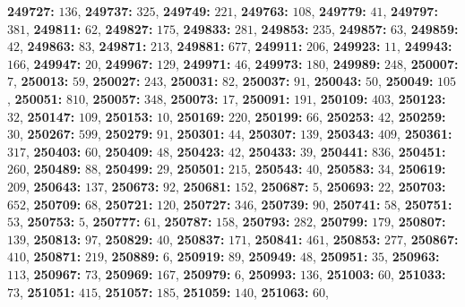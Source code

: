 \textsf{\bfseries 249727:} $136$, \textsf{\bfseries 249737:} $325$, \textsf{\bfseries 249749:} $221$, \textsf{\bfseries 249763:} $108$, \textsf{\bfseries 249779:} $41$, \textsf{\bfseries 249797:} $381$, \textsf{\bfseries 249811:} $62$, \textsf{\bfseries 249827:} $175$, \textsf{\bfseries 249833:} $281$, \textsf{\bfseries 249853:} $235$, \textsf{\bfseries 249857:} $63$, \textsf{\bfseries 249859:} $42$, \textsf{\bfseries 249863:} $83$, \textsf{\bfseries 249871:} $213$, \textsf{\bfseries 249881:} $677$, \textsf{\bfseries 249911:} $206$, \textsf{\bfseries 249923:} $11$, \textsf{\bfseries 249943:} $166$, \textsf{\bfseries 249947:} $20$, \textsf{\bfseries 249967:} $129$, \textsf{\bfseries 249971:} $46$, \textsf{\bfseries 249973:} $180$, \textsf{\bfseries 249989:} $248$, \textsf{\bfseries 250007:} $7$, \textsf{\bfseries 250013:} $59$, \textsf{\bfseries 250027:} $243$, \textsf{\bfseries 250031:} $82$, \textsf{\bfseries 250037:} $91$, \textsf{\bfseries 250043:} $50$, \textsf{\bfseries 250049:} $105$, \textsf{\bfseries 250051:} $810$, \textsf{\bfseries 250057:} $348$, \textsf{\bfseries 250073:} $17$, \textsf{\bfseries 250091:} $191$, \textsf{\bfseries 250109:} $403$, \textsf{\bfseries 250123:} $32$, \textsf{\bfseries 250147:} $109$, \textsf{\bfseries 250153:} $10$, \textsf{\bfseries 250169:} $220$, \textsf{\bfseries 250199:} $66$, \textsf{\bfseries 250253:} $42$, \textsf{\bfseries 250259:} $30$, \textsf{\bfseries 250267:} $599$, \textsf{\bfseries 250279:} $91$, \textsf{\bfseries 250301:} $44$, \textsf{\bfseries 250307:} $139$, \textsf{\bfseries 250343:} $409$, \textsf{\bfseries 250361:} $317$, \textsf{\bfseries 250403:} $60$, \textsf{\bfseries 250409:} $48$, \textsf{\bfseries 250423:} $42$, \textsf{\bfseries 250433:} $39$, \textsf{\bfseries 250441:} $836$, \textsf{\bfseries 250451:} $260$, \textsf{\bfseries 250489:} $88$, \textsf{\bfseries 250499:} $29$, \textsf{\bfseries 250501:} $215$, \textsf{\bfseries 250543:} $40$, \textsf{\bfseries 250583:} $34$, \textsf{\bfseries 250619:} $209$, \textsf{\bfseries 250643:} $137$, \textsf{\bfseries 250673:} $92$, \textsf{\bfseries 250681:} $152$, \textsf{\bfseries 250687:} $5$, \textsf{\bfseries 250693:} $22$, \textsf{\bfseries 250703:} $652$, \textsf{\bfseries 250709:} $68$, \textsf{\bfseries 250721:} $120$, \textsf{\bfseries 250727:} $346$, \textsf{\bfseries 250739:} $90$, \textsf{\bfseries 250741:} $58$, \textsf{\bfseries 250751:} $53$, \textsf{\bfseries 250753:} $5$, \textsf{\bfseries 250777:} $61$, \textsf{\bfseries 250787:} $158$, \textsf{\bfseries 250793:} $282$, \textsf{\bfseries 250799:} $179$, \textsf{\bfseries 250807:} $139$, \textsf{\bfseries 250813:} $97$, \textsf{\bfseries 250829:} $40$, \textsf{\bfseries 250837:} $171$, \textsf{\bfseries 250841:} $461$, \textsf{\bfseries 250853:} $277$, \textsf{\bfseries 250867:} $410$, \textsf{\bfseries 250871:} $219$, \textsf{\bfseries 250889:} $6$, \textsf{\bfseries 250919:} $89$, \textsf{\bfseries 250949:} $48$, \textsf{\bfseries 250951:} $35$, \textsf{\bfseries 250963:} $113$, \textsf{\bfseries 250967:} $73$, \textsf{\bfseries 250969:} $167$, \textsf{\bfseries 250979:} $6$, \textsf{\bfseries 250993:} $136$, \textsf{\bfseries 251003:} $60$, \textsf{\bfseries 251033:} $73$, \textsf{\bfseries 251051:} $415$, \textsf{\bfseries 251057:} $185$, \textsf{\bfseries 251059:} $140$, \textsf{\bfseries 251063:} $60$, 
